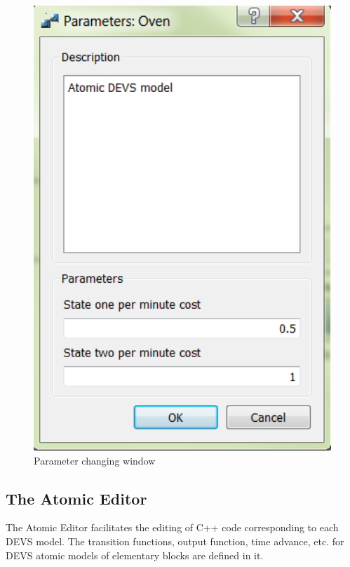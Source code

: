 \documentclass[titlepage]{report}%
\begin{document}
\begin{figure}[ht!]
  \centering
    \includegraphics[width=1\textwidth]{Fig5.png}
    \caption{Parameter changing window}
    \label{para_win}
\end{figure}


\subsection{The Atomic Editor}
The Atomic Editor facilitates the editing of C++ code corresponding to each DEVS model. The transition functions, output function, time advance, etc. for DEVS atomic models of elementary blocks are defined in it.
\end{document}
